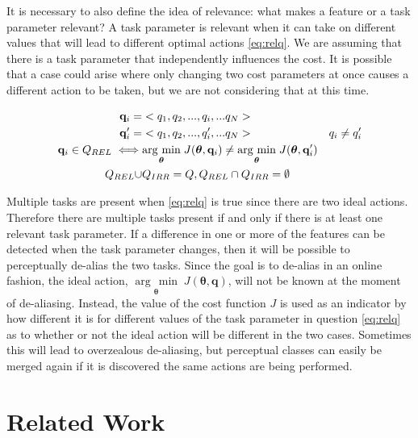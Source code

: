 \documentclass[12pt]{article}
\newcommand{\taskp}{\mathbf{q}}
\newcommand{\taskpv}{q}
\newcommand{\costf}{J}
\newcommand{\act}{\bm{\theta}}
\newcommand{\taskpsp}{Q}
\newcommand{\argmin}[1]{\underset{#1}{\operatorname{arg}\,\operatorname{min}}\;}
\begin{document}
 It is necessary to also define the idea of relevance: what makes a feature or a task parameter relevant? A task parameter is relevant when it can take on different values that will lead to different optimal actions \eqref{eq:relq}. We are assuming that there is a task parameter that independently influences the cost. It is possible that a case could arise where only changing two cost parameters at once causes a different action to be taken, but we are not considering that at this time. 

\begin{align}
\taskp_i =& <\taskpv_1,\taskpv_2,...,\taskpv_i,...\taskpv_N> \notag & 
\\
\taskp'_i =& <\taskpv_1,\taskpv_2,...,\taskpv'_i,...\taskpv_N> \notag & \taskpv_i \neq \taskpv'_i \\
\label{eq:relq} \taskp_i \in \taskpsp_{REL} \iff&\argmin{\act}\costf(\act,\taskp_i) \neq \argmin{\act}\costf(\act,\taskp'_i)\\
\taskpsp_{REL} \cup & \taskpsp_{IRR} = \taskpsp,   \taskpsp_{REL} \cap \taskpsp_{IRR} = \emptyset 
\end{align}

Multiple tasks are present when \eqref{eq:relq} is true since there are two ideal actions. Therefore there are multiple tasks present if and only if there is at least one relevant task parameter. If a difference in one or more of the features can be detected when the task parameter changes, then it will be possible to perceptually de-alias the two tasks. Since the goal is to de-alias in an online fashion, the ideal action, $\argmin{\act}\costf(\act,\taskp)$, will not be known at the moment of de-aliasing. Instead, the value of the cost function $\costf$ is used as an indicator by how different it is for different values of the task parameter in question \eqref{eq:relq} as to whether or not the ideal action will be different in the two cases. Sometimes this will lead to overzealous de-aliasing, but perceptual classes can easily be merged again if it is discovered the same actions are being performed.

\section{Related Work}
\end{document}
